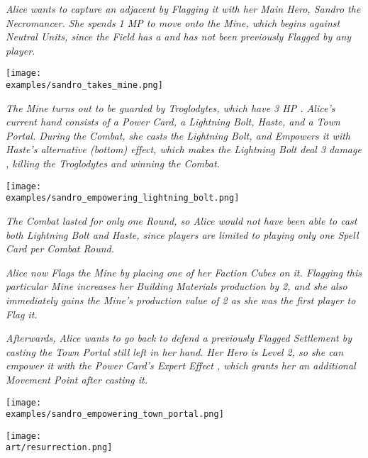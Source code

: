 \clearpage


\begin{multicols*}{2}

\textit{Alice wants to capture an adjacent  by Flagging it with her Main Hero, Sandro the Necromancer.
    She spends 1 MP to move onto the Mine, which begins  against Neutral Units, since the Field has a  and has not been previously Flagged by any player.}\par

\texttt{[image: \\examples/sandro\_takes\_mine.png]}

\textit{The Mine turns out to be guarded by Troglodytes, which have 3 HP .
Alice's current hand consists of a Power Card, a Lightning Bolt, Haste, and a Town Portal.
During the Combat, she casts the Lightning Bolt, and Empowers  it with Haste's alternative (bottom) effect, which makes the Lightning Bolt deal 3 damage , killing the Troglodytes and winning the Combat.}

\texttt{[image: \\examples/sandro\_empowering\_lightning\_bolt.png]}

\columnbreak
\textit{The Combat lasted for only one Round, so Alice would not have been able to cast both Lightning Bolt and Haste, since players are limited to playing only one Spell Card per Combat Round.}\par


\textit{Alice now Flags the Mine by placing one of her Faction Cubes on it.
    Flagging this particular Mine increases her Building Materials  production by 2, and she also immediately gains the Mine's production value of 2  as she was the first player to Flag it.}\par
\textit{Afterwards, Alice wants to go back to defend a previously Flagged Settlement by casting the Town Portal still left in her hand.
    Her Hero is Level 2, so she can empower it with the Power Card's Expert Effect , which grants her an additional Movement Point after casting it.
}

\texttt{[image: \\examples/sandro\_empowering\_town\_portal.png]}

\vfill
\hspace{2em}
{\texttt{[image: \\art/resurrection.png]}}
\end{multicols*}

